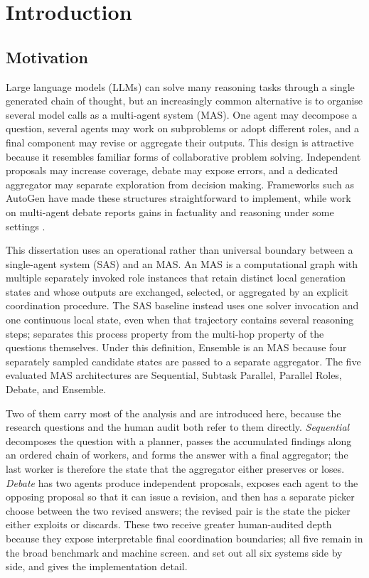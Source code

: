 \chapter{Introduction}
\label{chap:introduction}

\section{Motivation}

Large language models (LLMs) can solve many reasoning tasks through a single generated chain of thought, but an increasingly common alternative is to organise several model calls as a multi-agent system (MAS). One agent may decompose a question, several agents may work on subproblems or adopt different roles, and a final component may revise or aggregate their outputs. This design is attractive because it resembles familiar forms of collaborative problem solving. Independent proposals may increase coverage, debate may expose errors, and a dedicated aggregator may separate exploration from decision making. Frameworks such as AutoGen have made these structures straightforward to implement, while work on multi-agent debate reports gains in factuality and reasoning under some settings \citep{wu2023autogen,du2023debate,liang2023mad}.

This dissertation uses an operational rather than universal boundary between a single-agent system (SAS) and an MAS. An MAS is a computational graph with multiple separately invoked role instances that retain distinct local generation states and whose outputs are exchanged, selected, or aggregated by an explicit coordination procedure. The SAS baseline instead uses one solver invocation and one continuous local state, even when that trajectory contains several reasoning steps;  separates this process property from the multi-hop property of the questions themselves. Under this definition, Ensemble is an MAS because four separately sampled candidate states are passed to a separate aggregator. The five evaluated MAS architectures are Sequential, Subtask Parallel, Parallel Roles, Debate, and Ensemble.

Two of them carry most of the analysis and are introduced here, because the research questions and the human audit both refer to them directly. \emph{Sequential} decomposes the question with a planner, passes the accumulated findings along an ordered chain of workers, and forms the answer with a final aggregator; the last worker is therefore the state that the aggregator either preserves or loses. \emph{Debate} has two agents produce independent proposals, exposes each agent to the opposing proposal so that it can issue a revision, and then has a separate picker choose between the two revised answers; the revised pair is the state the picker either exploits or discards. These two receive greater human-audited depth because they expose interpretable final coordination boundaries; all five remain in the broad benchmark and machine screen.  and  set out all six systems side by side, and  gives the implementation detail.

